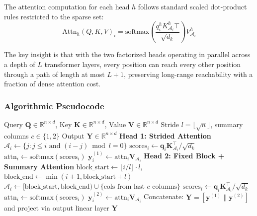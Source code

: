 The attention computation for each head $h$ follows standard scaled dot-product rules restricted to the sparse set:
\[
\text{Attn}_h(Q, K, V)_i = \text{softmax}\left(\frac{q_i^h K_{\mathcal{A}_i}^h\top}{\sqrt{d_k}}\right) V_{\mathcal{A}_i}^h
\]

The key insight is that with the two factorized heads operating in parallel across a depth of $L$ transformer layers, every position can reach every other position through a path of length at most $L + 1$, preserving long-range reachability with a fraction of dense attention cost.

\subsubsection{Algorithmic Pseudocode}

\begin{algorithm}[H]
\caption{Sparse Transformer Attention: Strided + Fixed Dual Heads}
\begin{algorithmic}[1]
\Require Query $\mathbf{Q} \in \mathbb{R}^{n \times d}$, Key $\mathbf{K} \in \mathbb{R}^{n \times d}$, Value $\mathbf{V} \in \mathbb{R}^{n \times d}$
\Require Stride $l = \lfloor\sqrt{n}\rfloor$, summary columns $c \in \{1, 2\}$
\Ensure Output $\mathbf{Y} \in \mathbb{R}^{n \times d}$
\State \textbf{Head 1: Strided Attention}
    \State $\mathcal{A}_i \gets \{j : j \leq i \text{ and } (i-j) \bmod l = 0\}$ 
    \State $\text{scores}_{i} \gets \mathbf{q}_i \mathbf{K}_{\mathcal{A}_i}^\top / \sqrt{d_k}$
    \State $\text{attn}_{i} \gets \text{softmax}(\text{scores}_{i})$
    \State $\mathbf{y}_i^{(1)} \gets \text{attn}_{i} \mathbf{V}_{\mathcal{A}_i}$
\EndFor
\State \textbf{Head 2: Fixed Block + Summary Attention}
    \State $\text{block\_start} \gets \lfloor i/l \rfloor \cdot l$, $\text{block\_end} \gets \min(i+1, \text{block\_start}+l)$
    \State $\mathcal{A}_i \gets [\text{block\_start}, \text{block\_end}) \cup \{\text{cols from last } c \text{ columns}\}$
    \State $\text{scores}_{i} \gets \mathbf{q}_i \mathbf{K}_{\mathcal{A}_i}^\top / \sqrt{d_k}$
    \State $\text{attn}_{i} \gets \text{softmax}(\text{scores}_{i})$
    \State $\mathbf{y}_i^{(2)} \gets \text{attn}_{i} \mathbf{V}_{\mathcal{A}_i}$
\EndFor
\State Concatenate: $\mathbf{Y} = [\mathbf{y}^{(1)} \| \mathbf{y}^{(2)}]$ and project via output linear layer
\Return $\mathbf{Y}$
\end{algorithmic}
\end{algorithm}

